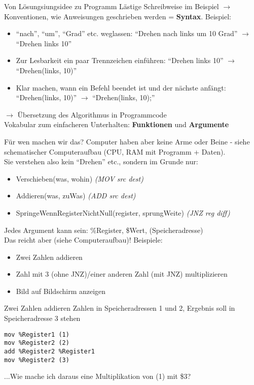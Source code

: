 \documentclass[t]{beamer}
\begin{document}
\begin{frame}{Von Lösungsiungsidee zu Programm}
	Lästige Schreibweise im Beispiel $\rightarrow$ Konventionen, wie Anweisungen geschrieben werden = \textbf{Syntax}. Beispiel:
	\begin{itemize}
		\item ``nach'', ``um'', ``Grad'' etc. weglassen: ``Drehen nach links um 10 Grad'' $\rightarrow$ ``Drehen links 10''
		\item Zur Lesbarkeit ein paar Trennzeichen einführen: ``Drehen links 10'' $\rightarrow$ ``Drehen(links, 10)''
		\item Klar machen, wann ein Befehl beendet ist und der nächste anfängt: ``Drehen(links, 10)'' $\rightarrow$ ``Drehen(links, 10);''
	\end{itemize}
	$\rightarrow$ Übersetzung des Algorithmus in Programmcode
	\\Vokabular zum einfacheren Unterhalten: \textbf{Funktionen} und \textbf{Argumente}
\end{frame}

\begin{frame}{Für wen machen wir das?}
	Computer haben aber keine Arme oder Beine - siehe schematischer Computeraufbau (CPU, RAM mit Programm + Daten).\\
	Sie verstehen also kein ``Drehen'' etc., sondern im Grunde nur:
	\begin{itemize}
		\item Verschieben(was, wohin) \textit{(MOV src dest)}
		\item Addieren(was, zuWas) \textit{(ADD src dest)}
		\item SpringeWennRegisterNichtNull(register, sprungWeite) \textit{(JNZ reg diff)}
	\end{itemize}
	Jedes Argument kann sein: \%Register, \$Wert, (Speicheradresse)\\
	Das reicht aber (siehe Computeraufbau)! Beispiele:
	\begin{itemize}
		\item Zwei Zahlen addieren
		\item Zahl mit 3 (ohne JNZ)/einer anderen Zahl (mit JNZ) multiplizieren
		\item Bild auf Bildschirm anzeigen
	\end{itemize}
\end{frame}

\begin{frame}[t,fragile]{Zwei Zahlen addieren}
	Zahlen in Speicheradressen 1 und 2, Ergebnis soll in Speicheradresse 3 stehen
	\lstset{language=[x86masm]Assembler,texcl=true}
	\begin{lstlisting}
mov %Register1 (1)
mov %Register2 (2)
add %Register2 %Register1
mov %Register2 (3)
	\end{lstlisting}
	...Wie mache ich daraus eine Multiplikation von (1) mit \$3?
\end{frame}
\end{document}
